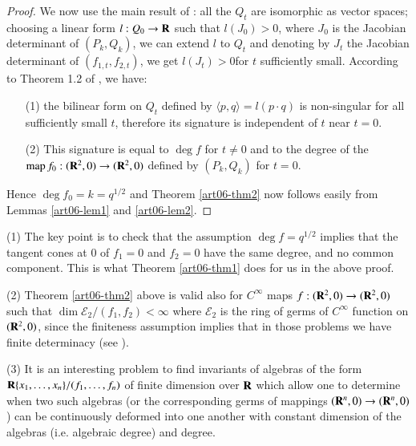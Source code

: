 \begin{proof}
We now use the main result of \cite{art06-keyE.L.}: all the $Q_t$ are isomorphic as vector spaces; choosing a linear form $l: Q_0\to \mathbf{R}$ such that $l(J_0)>0$, where $J_0$ is the Jacobian determinant of $(P_k, Q_k)$, we can extend $l$ to $Q_t$ and denoting by $J_t$ the Jacobian determinant of $(f_{1,t},f_{2,t})$, we get $l(J_t)>0$\pageoriginale  for $t$ sufficiently small. According to Theorem 1.2 of \cite{art06-keyE.L.}, we have:
\begin{enumerate}
\item[(1)] the bilinear form on $Q_t$ defined by $\langle p, q\rangle  =l(p\cdot q)$ is non-singular for all sufficiently small $t$, therefore its signature is independent of $t$ near $t =0$.

\item[(2)] This signature is equal to $\deg f$ for $t \neq 0$ and to the degree of the $\operatorname{map} f_0 : (\mathbf{R}^2, 0) \to (\mathbf{R}^2 , 0)$ defined by $(P_k, Q_k)$ for $t =0$.
\end{enumerate}

Hence $\deg f_0 = k = q^{1/2}$ and Theorem \ref{art06-thm2} now follows easily from Lemmas \ref{art06-lem1} and \ref{art06-lem2}. 
\end{proof}

\begin{remarks*}
\item[(1)] The key point is to check that the assumption $\deg f = q^{1/2}$ implies that the tangent cones at 0 of $f_1 = 0$ and $f_2 = 0$ have the same degree, and no common component. This is what Theorem \ref{art06-thm1} does for us in the above proof.

\item[(2)] Theorem \ref{art06-thm2} above is valid also for $C^\infty$ maps $f: (\mathbf{R}^2, 0) \to (\mathbf{R}^2, 0)$ such that $\dim \mathscr{E}_2 / (f_1, f_2) < \infty$ where $\mathscr{E}_2$ is the ring of germs of $C^\infty$ function on $(\mathbf{R}^2, 0)$, since the finiteness assumption implies that in those problems we have finite determinacy (see \cite{art06-keyE.L.}).

\item[(3)] It is an interesting problem to find invariants of algebras of the form $\mathbf{R} \{x_1, \ldots, x_n\} / (f_1, \ldots, f_n)$ of finite dimension over $\mathbf{R}$ which allow one to determine when two such algebras (or the corresponding germs of mappings $(\mathbf{R}^n, 0) \to (\mathbf{R}^n, 0)$) can be continuously deformed into one another with constant dimension of the algebras (i.e. algebraic degree) and degree. 
\end{remarks*}

